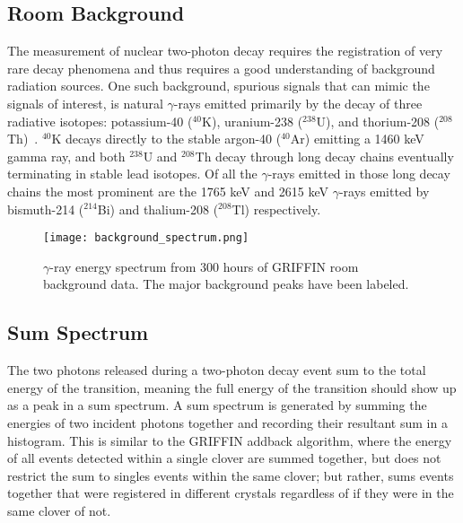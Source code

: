 \documentclass[cnatzke_thesis_proposal.tex]{subfiles}
\begin{document}
\subsection{Room Background}
\label{sec:room_background}
The measurement of nuclear two-photon decay requires the registration of very rare decay phenomena and thus requires a good understanding of background radiation sources. 
One such background, spurious signals that can mimic the signals of interest, is natural $\gamma$-rays emitted primarily by the decay of three radiative isotopes: potassium-40 ($^{40}$K), uranium-238 ($^{238}$U), and thorium-208 ($^{208}$Th)~\cite[]{aksoy_elemental_1994}.
$^{40}$K decays directly to the stable argon-40 ($^{40}$Ar) emitting a 1460 keV gamma ray, and both $^{238}$U and $^{208}$Th decay through long decay chains eventually terminating in stable lead isotopes. 
Of all the $\gamma$-rays emitted in those long decay chains the most prominent are the 1765 keV and 2615 keV $\gamma$-rays emitted by bismuth-214 ($^{214}$Bi) and thalium-208 ($^{208}$Tl) respectively.

\begin{figure}[htbp]
  \centering
  \texttt{[image: background\_spectrum.png]}
  \caption{$\gamma$-ray energy spectrum from 300 hours of GRIFFIN room background data. The major background peaks have been labeled.}
  \label{fig:background_spectrum}
\end{figure}

\subsection{Sum Spectrum}
\label{sec:sum_spectrum}

The two photons released during a two-photon decay event sum to the total energy of the transition, meaning the full energy of the transition should show up as a peak in a sum spectrum. 
A sum spectrum is generated by summing the energies of two incident photons together and recording their resultant sum in a histogram.
This is similar to the GRIFFIN addback algorithm, where the energy of all events detected within a single clover are summed together, but does not restrict the sum to singles events within the same clover; but rather, sums events together that were registered in different crystals regardless of if they were in the same clover of not. 



\end{document}
